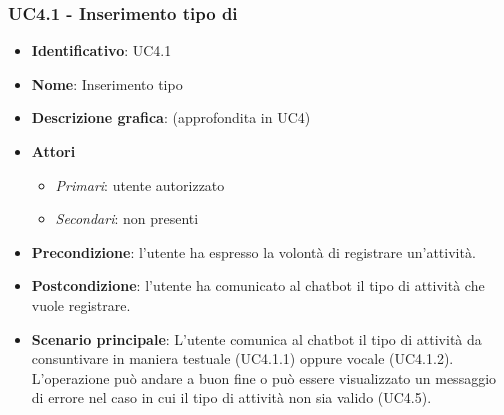 \subsubsection{UC4.1 - Inserimento tipo di }
\begin{itemize}
    \item \textbf{Identificativo}: UC4.1 
    \item \textbf{Nome}: Inserimento tipo  
    \item \textbf{Descrizione grafica}: (approfondita in UC4)
    \item \textbf{Attori}
        \begin{itemize} 
            \item \textit{Primari}: utente autorizzato
            \item \textit{Secondari}: non presenti
        \end{itemize}
    \item \textbf{Precondizione}: l'utente ha espresso la volontà di registrare un'attività. 
    \item \textbf{Postcondizione}: l'utente ha comunicato al chatbot il tipo di attività che vuole registrare. 
    \item \textbf{Scenario principale}: L'utente comunica al chatbot il tipo di attività da consuntivare in maniera testuale (UC4.1.1) oppure vocale (UC4.1.2). L'operazione può andare a buon fine o può essere visualizzato un messaggio di errore nel caso in cui il tipo di attività non sia valido (UC4.5).
\end{itemize}

